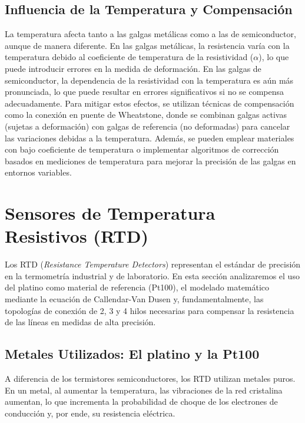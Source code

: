 \subsection{Influencia de la Temperatura y Compensación}
La temperatura afecta tanto a las galgas metálicas como a las de semiconductor, aunque de manera diferente. En las galgas metálicas, la resistencia varía con la temperatura debido al coeficiente de temperatura de la resistividad ($\alpha$), lo que puede introducir errores en la medida de deformación. En las galgas de semiconductor, la dependencia de la resistividad con la temperatura es aún más pronunciada, lo que puede resultar en errores significativos si no se compensa adecuadamente. Para mitigar estos efectos, se utilizan técnicas de compensación como la conexión en puente de Wheatstone, donde se combinan galgas activas (sujetas a deformación) con galgas de referencia (no deformadas) para cancelar las variaciones debidas a la temperatura. Además, se pueden emplear materiales con bajo coeficiente de temperatura o implementar algoritmos de corrección basados en mediciones de temperatura para mejorar la precisión de las galgas en entornos variables.

\section{Sensores de Temperatura Resistivos (RTD)}\label{sec:rtd}

Los RTD (\textit{Resistance Temperature Detectors}) representan el estándar de precisión en la termometría industrial y de laboratorio. En esta sección analizaremos el uso del platino como material de referencia (Pt100), el modelado matemático mediante la ecuación de Callendar-Van Dusen y, fundamentalmente, las topologías de conexión de 2, 3 y 4 hilos necesarias para compensar la resistencia de las líneas en medidas de alta precisión.



\subsection{Metales Utilizados: El platino y la Pt100}

A diferencia de los termistores semiconductores, los RTD utilizan metales puros. En un metal, al aumentar la temperatura, las vibraciones de la red cristalina aumentan, lo que incrementa la probabilidad de choque de los electrones de conducción y, por ende, su resistencia eléctrica.

